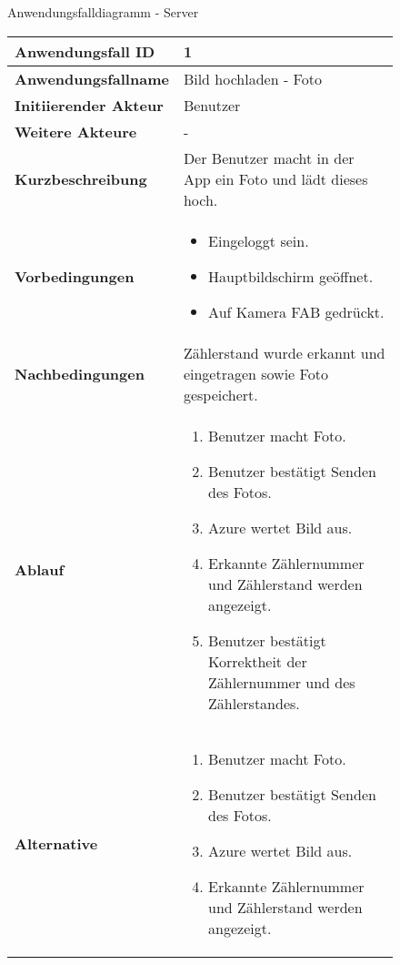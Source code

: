 \begin{figure}[h]
	\centering
	\caption{Anwendungsfalldiagramm - Server}
	\label{fig:anwendungsfalldiagramm-server}
\end{figure}

\newpage

\begin{figure}[h]
	\centering
	\begin{tabularx}{\textwidth}{ X | X }
		\textbf{Anwendungsfall ID} & 1 \\ \hline
		\textbf{Anwendungsfallname} & Bild hochladen  - Foto \\ \hline
		\textbf{Initiierender Akteur} & Benutzer \\ \hline
		\textbf{Weitere Akteure} & - \\ \hline
		\textbf{Kurzbeschreibung} & Der Benutzer macht in der App ein Foto und lädt dieses hoch.   \\ \hline
		\textbf{Vorbedingungen} & 
		\begin {itemize}
			\item Eingeloggt sein. 
			\item Hauptbildschirm geöffnet.
			\item Auf Kamera FAB gedrückt.
		\end{itemize} \\ \hline
		\textbf{Nachbedingungen} & Zählerstand wurde erkannt und eingetragen sowie Foto gespeichert.  \\ \hline
		\textbf{Ablauf} &
		\begin{enumerate}
			\item Benutzer macht Foto.
			\item Benutzer bestätigt Senden des Fotos.
			\item Azure wertet Bild aus.
			\item Erkannte Zählernummer und Zählerstand werden angezeigt.
			\item Benutzer bestätigt Korrektheit der Zählernummer und des Zählerstandes.
		\end{enumerate} \\ \hline
		\textbf{Alternative} &
		\begin{enumerate}
			\item Benutzer macht Foto.
			\item Benutzer bestätigt Senden des Fotos.
			\item Azure wertet Bild aus.
			\item Erkannte Zählernummer und Zählerstand werden angezeigt.

\end{enumerate}
\end{tabularx}
\end{figure}
